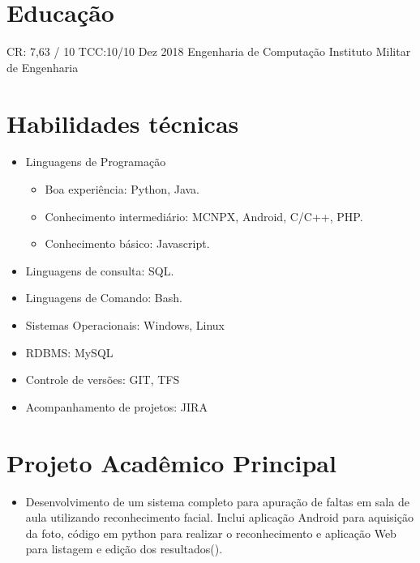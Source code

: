 \documentclass{tccv}
\begin{document}
\section{Educação}

\begin{yearlist}

    \item[CR: 7,63 / 10 \newline TCC:10/10 ]{Dez 2018}
        {Engenharia de Computação}
        {Instituto Militar de Engenharia}

\end{yearlist}

\section{Habilidades técnicas}
    
    \begin{itemize}  
        \item Linguagens de Programação
            \begin{itemize}
                \item Boa experiência: Python, Java.
                \item Conhecimento intermediário: MCNPX, Android, C/C++, PHP.
                \item Conhecimento básico: Javascript.
            \end{itemize}
        \item Linguagens de consulta: SQL.
        \item Linguagens de Comando: Bash.
        \item Sistemas Operacionais: Windows, Linux
        \item RDBMS: MySQL 
        \item Controle de versões: GIT, TFS
        \item Acompanhamento de projetos: JIRA
    \end{itemize}

\section{Projeto Acadêmico Principal}
    
    \begin{itemize}
        \item Desenvolvimento de um sistema completo para apuração de faltas em sala de aula utilizando reconhecimento facial. Inclui aplicação Android para aquisição da foto, código em python para realizar o reconhecimento e aplicação Web para listagem e edição dos resultados(\href{https://github.com/gdelfs/Tchau-Papeleta-de-Faltas}{\faCode}).
     \begin{comment}
        \item Desenvolvimento de um chat entre mobile e computador utilizando comunicação TCP entre as respectivas aplicações Android e Java (\href{https://github.com/gdelfs/Messenger-Android-Computador}{\faCode}).
     \end{comment}
    \end{itemize}
\end{document}

